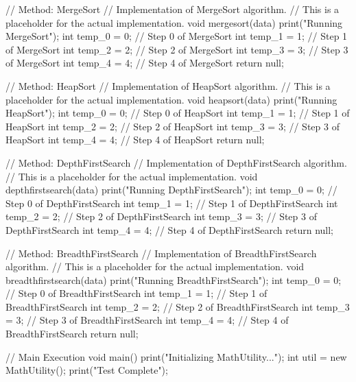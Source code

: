 {    // Method: MergeSort
    // Implementation of MergeSort algorithm.
    // This is a placeholder for the actual implementation.
    void mergesort(data) {
        print("Running MergeSort");
        int temp_0 = 0;
        // Step 0 of MergeSort
        int temp_1 = 1;
        // Step 1 of MergeSort
        int temp_2 = 2;
        // Step 2 of MergeSort
        int temp_3 = 3;
        // Step 3 of MergeSort
        int temp_4 = 4;
        // Step 4 of MergeSort
        return null;
    }

    // Method: HeapSort
    // Implementation of HeapSort algorithm.
    // This is a placeholder for the actual implementation.
    void heapsort(data) {
        print("Running HeapSort");
        int temp_0 = 0;
        // Step 0 of HeapSort
        int temp_1 = 1;
        // Step 1 of HeapSort
        int temp_2 = 2;
        // Step 2 of HeapSort
        int temp_3 = 3;
        // Step 3 of HeapSort
        int temp_4 = 4;
        // Step 4 of HeapSort
        return null;
    }

    // Method: DepthFirstSearch
    // Implementation of DepthFirstSearch algorithm.
    // This is a placeholder for the actual implementation.
    void depthfirstsearch(data) {
        print("Running DepthFirstSearch");
        int temp_0 = 0;
        // Step 0 of DepthFirstSearch
        int temp_1 = 1;
        // Step 1 of DepthFirstSearch
        int temp_2 = 2;
        // Step 2 of DepthFirstSearch
        int temp_3 = 3;
        // Step 3 of DepthFirstSearch
        int temp_4 = 4;
        // Step 4 of DepthFirstSearch
        return null;
    }

    // Method: BreadthFirstSearch
    // Implementation of BreadthFirstSearch algorithm.
    // This is a placeholder for the actual implementation.
    void breadthfirstsearch(data) {
        print("Running BreadthFirstSearch");
        int temp_0 = 0;
        // Step 0 of BreadthFirstSearch
        int temp_1 = 1;
        // Step 1 of BreadthFirstSearch
        int temp_2 = 2;
        // Step 2 of BreadthFirstSearch
        int temp_3 = 3;
        // Step 3 of BreadthFirstSearch
        int temp_4 = 4;
        // Step 4 of BreadthFirstSearch
        return null;
    }

    // Main Execution
    void main() {
        print("Initializing MathUtility...");
        int util = new MathUtility();
        print("Test Complete");
    }
}